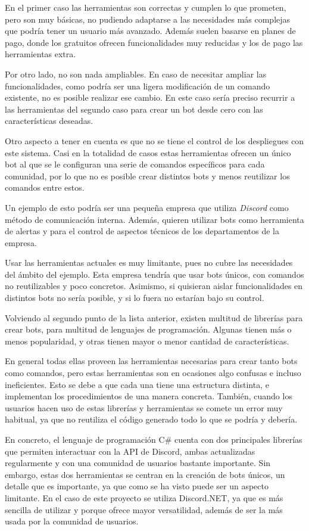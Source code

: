 En el primer caso las herramientas son correctas y cumplen lo que prometen, pero son muy básicas, no pudiendo adaptarse a las necesidades más complejas que podría tener un usuario más avanzado. Además suelen basarse en planes de pago, donde los gratuitos ofrecen funcionalidades muy reducidas y los de pago las herramientas extra.

Por otro lado, no son nada ampliables. En caso de necesitar ampliar las funcionalidades, como podría ser una ligera modificación de un comando existente, no es posible realizar ese cambio. En este caso sería preciso recurrir a las herramientas del segundo caso para crear un bot desde cero con las características deseadas.

Otro aspecto a tener en cuenta es que no se tiene el control de los despliegues con este sistema. Casi en la totalidad de casos estas herramientas ofrecen un único bot al que se le configuran una serie de comandos específicos para cada comunidad, por lo que no es posible crear distintos bots y menos reutilizar los comandos entre estos.

Un ejemplo de esto podría ser una pequeña empresa que utiliza \textit{Discord} como método de comunicación interna. Además, quieren utilizar bots como herramienta de alertas y para el control de aspectos técnicos de los departamentos de la empresa.

Usar las herramientas actuales es muy limitante, pues no cubre las necesidades del ámbito del ejemplo. Esta empresa tendría que usar bots únicos, con comandos no reutilizables y poco concretos. Asimismo, si quisieran aislar funcionalidades en distintos bots no sería posible, y si lo fuera no estarían bajo su control.

Volviendo al segundo punto de la lista anterior, existen multitud de librerías para crear bots, para multitud de lenguajes de programación. Algunas tienen más o menos popularidad, y otras tienen mayor o menor cantidad de características.

En general todas ellas proveen las herramientas necesarias para crear tanto bots como comandos, pero estas herramientas son en ocasiones algo confusas e incluso ineficientes. Esto se debe a que cada una tiene una estructura distinta, e implementan los procedimientos de una manera concreta. También, cuando los usuarios hacen uso de estas librerías y herramientas se comete un error muy habitual, ya que no reutiliza el código generado todo lo que se podría y debería.

En concreto, el lenguaje de programación C\# cuenta con dos principales librerías que permiten interactuar con la API de Discord, ambas actualizadas regularmente y con una comunidad de usuarios bastante importante. Sin embargo, estas dos herramientas se centran en la creación de bots únicos, un detalle que es importante, ya que como se ha visto puede ser un aspecto limitante. En el caso de este proyecto se utiliza Discord.NET, ya que es más sencilla de utilizar y porque ofrece mayor versatilidad, además de ser la más usada por la comunidad de usuarios.

